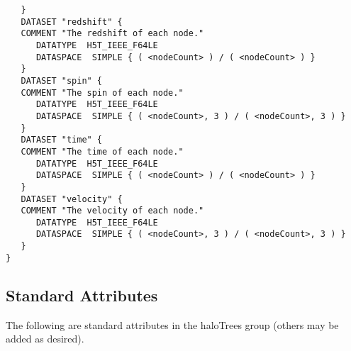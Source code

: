\begin{verbatim}
   }
   DATASET "redshift" {
   COMMENT "The redshift of each node."
      DATATYPE  H5T_IEEE_F64LE
      DATASPACE  SIMPLE { ( <nodeCount> ) / ( <nodeCount> ) }
   }
   DATASET "spin" {
   COMMENT "The spin of each node."
      DATATYPE  H5T_IEEE_F64LE
      DATASPACE  SIMPLE { ( <nodeCount>, 3 ) / ( <nodeCount>, 3 ) }
   }
   DATASET "time" {
   COMMENT "The time of each node."
      DATATYPE  H5T_IEEE_F64LE
      DATASPACE  SIMPLE { ( <nodeCount> ) / ( <nodeCount> ) }
   }
   DATASET "velocity" {
   COMMENT "The velocity of each node."
      DATATYPE  H5T_IEEE_F64LE
      DATASPACE  SIMPLE { ( <nodeCount>, 3 ) / ( <nodeCount>, 3 ) }
   }
}
\end{verbatim}

\subsection{Standard Attributes}

The following are standard attributes in the {\normalfont \ttfamily haloTrees} group (others may be added as desired).

